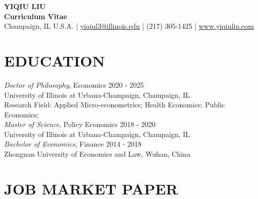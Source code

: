 \documentclass[a4paper,9pt]{extarticle}
\begin{document}
\pagestyle{empty}

\begin{center}
\textbf{\Large YIQIU LIU }\\[3pt] %
\textbf{Curriculum Vitae}\\[1pt] %
Champaign, IL U.S.A. | \href{mailto:yiqiul3@illinois.edu}{yiqiul3@illinois.edu} | (217) 305-1425 | \href{www.yiqiuliu.com}{www.yiqiuliu.com} %
\end{center}


\section*{EDUCATION}

\noindent
{\sl Doctor of Philosophy}, 
Economics \hfill  2020 - 2025 \\ 
University of Illinois at Urbana-Champaign, Champaign, IL \\ 
Research Field: Applied Micro-econometrics; Health Economics; Public Economics; \\

\noindent
{\sl Master of Science}, 
Policy Economics \hfill  2018 - 2020  \\ 
University of Illinois at Urbana-Champaign, Champaign, IL \\ 

\noindent
{\sl Bachelor of Economics}, 
Finance \hfill  2014 - 2018 \\ 
Zhongnan University of Economics and Law, Wuhan, China  \\ 

\section*{JOB MARKET PAPER}
\end{document}
